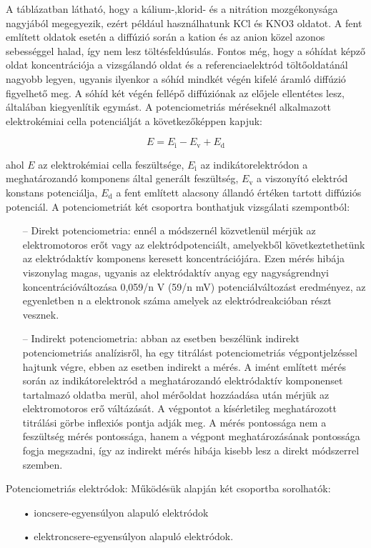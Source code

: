 A táblázatban látható, hogy a kálium-,klorid- és a nitrátion mozgékonysága nagyjából megegyezik, ezért például használhatunk KCl és KNO3 oldatot.
A fent említett oldatok esetén a diffúzió során a kation és az anion közel azonos sebességgel halad, így nem lesz töltésfeldúsulás. Fontos még, hogy a sóhídat képző oldat koncentrációja a vizsgálandó oldat és a referenciaelektród töltőoldatánál nagyobb legyen, ugyanis ilyenkor a sóhíd mindkét végén kifelé áramló diffúzió figyelhető meg. A sóhíd két végén fellépő diffúziónak az előjele ellentétes lesz, általában kiegyenlítik egymást. A potenciometriás méréseknél alkalmazott elektrokémiai cella potenciálját a következőképpen kapjuk:

\begin{equation}
E= E_\text{i} - E_\text{v} + E_\text{d}
\end{equation}

ahol $E$ az elektrokémiai cella feszültsége, $E_\text{i}$ az indikátorelektródon a meghatározandó komponens által generált feszültség, $E_\text{v}$ a viszonyító elektród konstans potenciálja, $E_\text{d}$ a fent említett alacsony állandó értéken tartott diffúziós potenciál.
A potenciometriát két csoportra bonthatjuk vizsgálati szempontból: 

\begin{itemize}
\item[--]Direkt potenciometria: ennél a módszernél közvetlenül mérjük az elektromotoros erőt vagy az elektródpotenciált, amelyekből következtethetünk az elektródaktív komponens keresett koncentrációjára. Ezen mérés hibája viszonylag magas, ugyanis az elektródaktív anyag egy nagyságrendnyi koncentrációváltozása 0,059/n V (59/n mV) potenciálváltozást eredményez, az egyenletben n a elektronok száma amelyek az elektródreakcióban részt vesznek.
\item[--]Indirekt potenciometria: abban az esetben beszélünk indirekt potenciometriás analízisről, ha egy titrálást potenciometriás végpontjelzéssel hajtunk végre, ebben az esetben indirekt a mérés. A imént említett mérés során az indikátorelektród a meghatározandó elektródaktív komponenset tartalmazó oldatba merül, ahol mérőoldat hozzáadása után mérjük az elektromotoros erő váltázását. A végpontot a kísérletileg meghatározott titrálási görbe inflexiós pontja adják meg. A mérés pontossága nem a feszültség mérés  pontossága, hanem a végpont meghatározásának pontossága fogja megszadni, így az indirekt mérés hibája kisebb lesz a direkt módszerrel szemben.
\end{itemize}
Potenciometriás elektródok:
Működésük alapján két csoportba sorolhatók:
\begin{itemize}
\item[•]ioncsere-egyensúlyon alapuló elektródok
\item[•]elektroncsere-egyensúlyon alapuló elektródok.
\end{itemize} 


